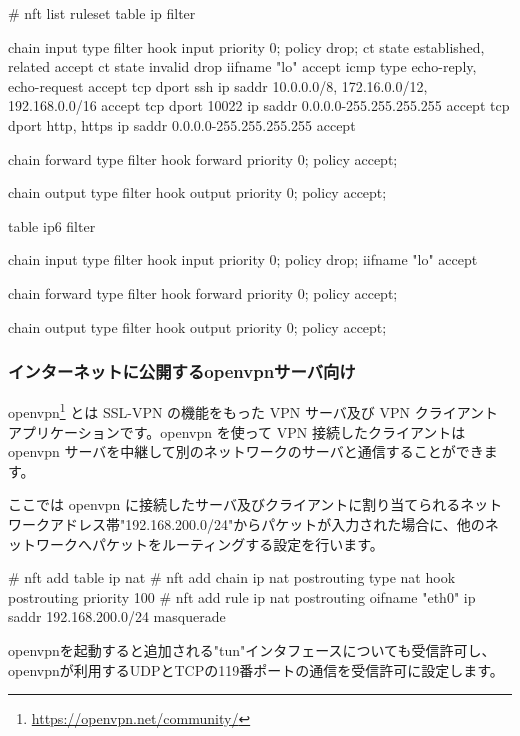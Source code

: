 \documentclass[mingoth,a4paper]{jsarticle}
\begin{document}
\begin{commandline}
# nft list ruleset
table ip filter {
    chain input {
        type filter hook input priority 0; policy drop;
        ct state { established, related } accept
        ct state { invalid } drop
        iifname "lo" accept
        icmp type { echo-reply, echo-request } accept
        tcp dport ssh ip saddr { 10.0.0.0/8, 172.16.0.0/12, 192.168.0.0/16 } accept
        tcp dport 10022 ip saddr { 0.0.0.0-255.255.255.255 } accept
        tcp dport { http, https } ip saddr { 0.0.0.0-255.255.255.255 } accept
    }

    chain forward {
        type filter hook forward priority 0; policy accept;
    }

    chain output {
        type filter hook output priority 0; policy accept;
    }
}
table ip6 filter {
    chain input {
        type filter hook input priority 0; policy drop;
        iifname "lo" accept
    }

    chain forward {
        type filter hook forward priority 0; policy accept;
    }

    chain output {
        type filter hook output priority 0; policy accept;
    }
}
\end{commandline}


\subsubsection{インターネットに公開するopenvpnサーバ向け}

openvpn\footnote{\url{https://openvpn.net/community/}} とは SSL-VPN の機能をもった VPN サーバ及び VPN クライアントアプリケーションです。openvpn を使って VPN 接続したクライアントは openvpn サーバを中継して別のネットワークのサーバと通信することができます。

ここでは openvpn に接続したサーバ及びクライアントに割り当てられるネットワークアドレス帯"192.168.200.0/24"からパケットが入力された場合に、他のネットワークへパケットをルーティングする設定を行います。

\begin{commandline}
# nft add table ip nat
# nft add chain ip nat postrouting { type nat hook postrouting priority 100 \; }
# nft add rule ip nat postrouting oifname "eth0" ip saddr 192.168.200.0/24 masquerade 
\end{commandline}

openvpnを起動すると追加される"tun"インタフェースについても受信許可し、openvpnが利用するUDPとTCPの119番ポートの通信を受信許可に設定します。
\end{document}
